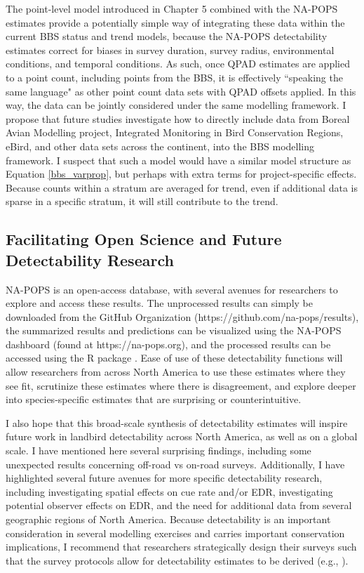 The point-level model introduced in Chapter 5 combined with the NA-POPS estimates provide a potentially simple way of integrating these data within the current BBS status and trend models, because the NA-POPS detectability estimates correct for biases in survey duration, survey radius, environmental conditions, and temporal conditions.
As such, once QPAD \citep{solymos_calibrating_2013} estimates are applied to a point count, including points from the BBS, it is effectively ``speaking the same language" as other point count data sets with QPAD offsets applied.
In this way, the data can be jointly considered under the same modelling framework.
I propose that future studies investigate how to directly include data from Boreal Avian Modelling project, Integrated Monitoring in Bird Conservation Regions, eBird, and other data sets across the continent, into the BBS modelling framework.
I suspect that such a model would have a similar model structure as Equation \ref{bbs_varprop}, but perhaps with extra terms for project-specific effects.
Because counts within a stratum are averaged for trend, even if additional data is sparse in a specific stratum, it will still contribute to the trend.

\subsection{Facilitating Open Science and Future Detectability Research}

\par NA-POPS is an open-access database, with several avenues for researchers to explore and access these results. The unprocessed results can simply be downloaded from the GitHub Organization (https://github.com/na-pops/results), the summarized results and predictions can be visualized using the NA-POPS dashboard (found at https://na-pops.org), and the processed results can be accessed using the R package  \citep{edwards_napops_2024}. Ease of use of these detectability functions will allow researchers from across North America to use these estimates where they see fit, scrutinize these estimates where there is disagreement, and explore deeper into species-specific estimates that are surprising or counterintuitive.

\par I also hope that this broad-scale synthesis of detectability estimates will inspire future work in landbird detectability across North America, as well as on a global scale. I have mentioned here several surprising findings, including some unexpected results concerning off-road vs on-road surveys. Additionally, I have highlighted several future avenues for more specific detectability research, including investigating spatial effects on cue rate and/or EDR, investigating potential observer effects on EDR, and the need for additional data from several geographic regions of North America. Because detectability is an important consideration in several modelling exercises and carries important conservation implications, I recommend that researchers strategically design their surveys such that the survey protocols allow for detectability estimates to be derived (e.g., \citet{matsuoka_reviving_2014}). 

